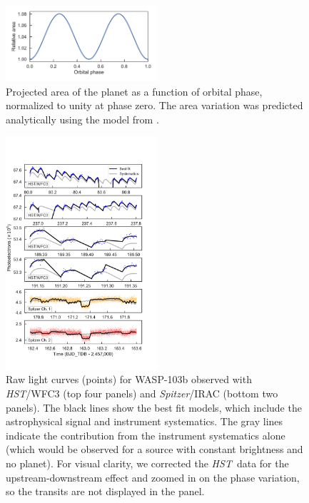 \documentclass[twocolumn, trackchanges]{aastex61}
\newcommand{\project}[1]{\textsl{#1}}
\newcommand{\HST}{\project{HST}}
\newcommand{\Spitzer}{\project{Spitzer}}
\begin{document}
\begin{figure}
\includegraphics[width = 0.5\textwidth]{fig2.pdf}
\caption{Projected area of the planet as a function of orbital phase, normalized to unity at phase zero. The area variation was predicted analytically using the model from \cite{leconte11b}.}
\label{fig:ellipsoidal}
\end{figure}

\begin{figure}
    \includegraphics[width = 0.5\textwidth, trim={0cm 1cm 0cm 3cm},clip]{fig3.pdf}
\caption{Raw light curves (points) for WASP-103b observed with \HST/WFC3 (top four panels) and \Spitzer/IRAC (bottom two panels). The black lines show the best fit models, which include the astrophysical signal and instrument systematics. The gray lines indicate the contribution from the instrument systematics alone (which would be observed for a source with constant brightness and no planet). For visual clarity, we corrected the \HST\ data for the upstream-downstream effect and zoomed in on the phase variation, so the transits are not displayed in the panel.}
\label{fig:systematics}
\end{figure}
\end{document}

